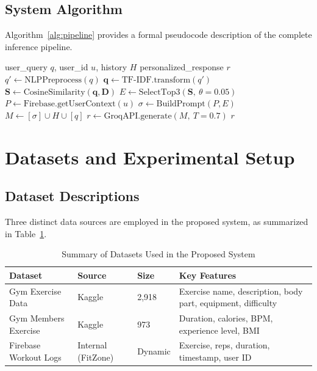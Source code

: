 \documentclass[conference]{IEEEtran}
\begin{document}
\subsection{System Algorithm}

Algorithm~\ref{alg:pipeline} provides a formal pseudocode description of the complete inference pipeline.

\begin{algorithm}
\caption{Personalized Fitness Response Generation}
\label{alg:pipeline}
\begin{algorithmic}[1]
\REQUIRE user\_query $q$, user\_id $u$, history $H$
\ENSURE personalized\_response $r$
\STATE $q' \leftarrow \text{NLPPreprocess}(q)$
\STATE $\mathbf{q} \leftarrow \text{TF-IDF.transform}(q')$
\STATE $\mathbf{S} \leftarrow \text{CosineSimilarity}(\mathbf{q}, \mathbf{D})$
\STATE $E \leftarrow \text{SelectTop3}(\mathbf{S},\ \theta=0.05)$
\STATE $P \leftarrow \text{Firebase.getUserContext}(u)$
\STATE $\sigma \leftarrow \text{BuildPrompt}(P, E)$
\STATE $M \leftarrow [\sigma] \cup H \cup [q]$
\STATE $r \leftarrow \text{GroqAPI.generate}(M,\ T=0.7)$
\RETURN $r$
\end{algorithmic}
\end{algorithm}

\section{Datasets and Experimental Setup}

\subsection{Dataset Descriptions}

Three distinct data sources are employed in the proposed system, as summarized in Table~\ref{tab:datasets}.

\begin{table}[htbp]
\caption{Summary of Datasets Used in the Proposed System}
\label{tab:datasets}
\centering
\begin{tabular}{p{1.2cm} p{1.4cm} p{0.7cm} p{3.2cm}}
\toprule
\textbf{Dataset} & \textbf{Source} & \textbf{Size} & \textbf{Key Features} \\
\midrule
Gym Exercise Data & Kaggle \cite{kaggle_exercise} & 2,918 & Exercise name, description, body part, equipment, difficulty \\
\midrule
Gym Members Exercise & Kaggle \cite{kaggle_members} & 973 & Duration, calories, BPM, experience level, BMI \\
\midrule
Firebase Workout Logs & Internal (FitZone) & Dynamic & Exercise, reps, duration, timestamp, user ID \\
\bottomrule
\end{tabular}
\end{table}
\end{document}
